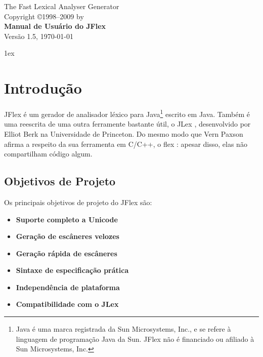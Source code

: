 \documentclass[11pt]{scrartcl}
\newcommand{\ver}{1.5}
\begin{document}


\begin{center}
\sffamily
{\Large The Fast Lexical Analyser Generator}\\
\smallskip\smallskip
Copyright \copyright 1998--2009 by \\
\bigskip
{\Huge \sffamily \bfseries Manual de Usu\'ario do JFlex}\\
\bigskip
Vers\~ao \ver, {\today}
\end{center}

\tableofcontents
\vfill
\newpage
\parindent0pt\parskip1ex
\pagestyle{headings}
\section{Introdu\c{c}\~ao\label{Intro}}
JFlex \'e um gerador de analisador l\'exico para Java\footnote{Java \'e uma marca registrada da  
Sun Microsystems, Inc., e se refere \`a linguagem de programa\c{c}\~ao Java da Sun. 
JFlex n\~ao \'e financiado ou afiliado \`a Sun Microsystems, Inc.}
escrito em Java. Tamb\'em \'e uma reescrita de uma outra ferramente bastante \'util, o JLex \cite{JLex}, desenvolvido
por Elliot Berk na Universidade de Princeton. Do mesmo modo que Vern Paxson afirma 
a respeito da sua ferramenta em C/C++, o flex \cite{flex}: apesar disso, elas n\~ao compartilham c\'odigo algum.

\subsection{Objetivos de Projeto}
Os principais objetivos de projeto do JFlex s\~ao:
\begin{itemize}
\item {\bf Suporte completo a Unicode}
\item {\bf Gera\c{c}\~ao de esc\^aneres velozes }
\item {\bf Gera\c{c}\~ao r\'apida de esc\^aneres }
\item {\bf Sintaxe de especifica\c{c}\~ao pr\'atica }
\item {\bf Independ\^encia de plataforma }
\item {\bf Compatibilidade com o JLex }
\end{itemize}
\end{document}

